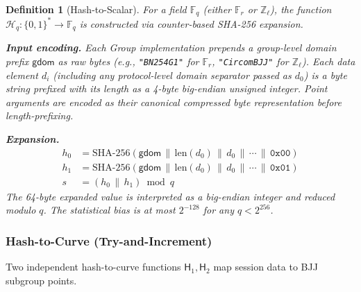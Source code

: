 \documentclass[11pt,a4paper]{article}
\newtheorem{definition}{Definition}[section]
\newcommand{\F}{\mathbb{F}}
\newcommand{\Z}{\mathbb{Z}}
\newcommand{\Fr}{\F_r}
\newcommand{\Fl}{\Z_\ell}
\newcommand{\hash}{\mathcal{H}}
\newcommand{\hashcurve}{\mathsf{H}}
\begin{document}
\begin{definition}[Hash-to-Scalar]
  \label{def:hashtoscalar}
  For a field $\F_q$ (either $\Fr$ or $\Fl$), the function
  $\hash_q: \{0,1\}^* \to \F_q$
  is constructed via counter-based SHA-256 expansion.

  \medskip\noindent
  \textbf{Input encoding.} Each Group implementation prepends a
  \emph{group-level domain prefix} $\mathsf{gdom}$ as raw bytes
  (e.g., \texttt{"BN254G1"} for $\Fr$, \texttt{"CircomBJJ"} for $\Fl$).
  Each data element $d_i$ (including any protocol-level domain separator
  passed as $d_0$) is a byte string prefixed with its length as a 4-byte
  big-endian unsigned integer.
  Point arguments are encoded as their canonical compressed byte representation
  before length-prefixing.

  \medskip\noindent
  \textbf{Expansion.}
  \begin{align}
    h_0 &= \mathrm{SHA\text{-}256}(\mathsf{gdom} \,\|\, \mathrm{len}(d_0) \,\|\, d_0 \,\|\, \cdots \,\|\, \texttt{0x00}) \\
    h_1 &= \mathrm{SHA\text{-}256}(\mathsf{gdom} \,\|\, \mathrm{len}(d_0) \,\|\, d_0 \,\|\, \cdots \,\|\, \texttt{0x01}) \\
    s &= (h_0 \,\|\, h_1) \bmod q
  \end{align}
  The 64-byte expanded value is interpreted as a big-endian integer and reduced
  modulo $q$. The statistical bias is at most $2^{-128}$ for any $q < 2^{256}$.
\end{definition}

\subsubsection{Hash-to-Curve (Try-and-Increment)}
\label{sec:hashtocurve}

Two independent hash-to-curve functions $\hashcurve_1, \hashcurve_2$ map
session data to BJJ subgroup points.
\end{document}

